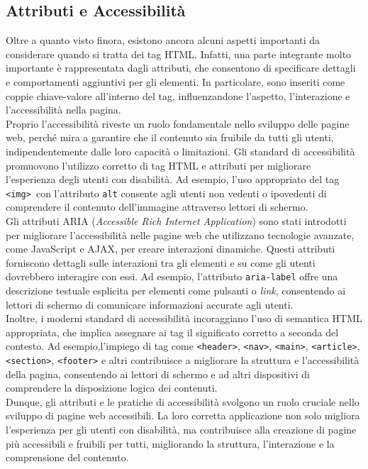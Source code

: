 \subsection{Attributi e Accessibilità}

Oltre a quanto visto finora, esistono ancora alcuni aspetti importanti da considerare quando si tratta dei tag HTML. Infatti, una parte integrante molto importante è rappresentata dagli attributi, che consentono di specificare dettagli e comportamenti aggiuntivi per gli elementi. In particolare, sono inseriti come coppie chiave-valore all’interno del tag, influenzandone l’aspetto, l’interazione e l’accessibilità nella pagina.\cite{HTML_kinsta}\\
Proprio l’accessibilità riveste un ruolo fondamentale nello sviluppo delle pagine web, perché mira a garantire che il contenuto sia fruibile da tutti gli utenti, indipendentemente dalle loro capacità o limitazioni. Gli standard di accessibilità promuovono l’utilizzo corretto di tag HTML e attributi per migliorare l’esperienza degli utenti con disabilità. Ad esempio, l’uso appropriato del tag \texttt{<img> }con l’attributo \texttt{alt} consente agli utenti non vedenti o ipovedenti di comprendere il contenuto dell’immagine attraverso lettori di schermo.\\
Gli attributi ARIA (\textit{Accessible Rich Internet Application}) sono stati introdotti per migliorare l’accessibilità nelle pagine web che utilizzano tecnologie avanzate, come JavaScript e AJAX, per creare interazioni dinamiche. Questi attributi forniscono dettagli sulle interazioni tra gli elementi e su come gli utenti dovrebbero interagire con essi. Ad esempio, l’attributo \texttt{aria-label} offre una descrizione testuale esplicita per elementi come pulsanti o \textit{link}, consentendo ai lettori di schermo di comunicare informazioni accurate agli utenti.\\
Inoltre, i moderni standard di accessibilità incoraggiano l’uso di semantica HTML appropriata, che implica assegnare ai tag il significato corretto a seconda del contesto. Ad esempio,l’impiego di tag come \texttt{<header>}, \texttt{<nav>}, \texttt{<main>}, \texttt{<article>}, \texttt{<section>}, \texttt{<footer>} e altri contribuisce a migliorare la struttura e l'accessibilità della pagina, consentendo ai lettori di schermo e ad altri dispositivi di comprendere la disposizione logica dei contenuti.\cite{HTML_w3}\\
Dunque, gli attributi e le pratiche di accessibilità svolgono un ruolo cruciale nello sviluppo di pagine web accessibili. La loro corretta applicazione non solo migliora l’esperienza per gli utenti con disabilità, ma contribuisce alla creazione di pagine più accessibili e fruibili per tutti, migliorando la struttura, l’interazione e la comprensione del contenuto.

